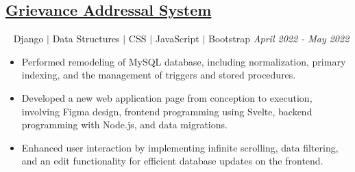 \documentclass[12pt]{article}
\begin{document}
\subsection*{\href{https://github.com/Akanksha2403/no_issues}{Grievance Addressal System}}~ Django $\vert$ Data Structures $\vert$ CSS $\vert$ JavaScript $\vert$ Bootstrap \hfill \textit{April 2022 - May 2022} \\
\begin{itemize}[leftmargin=*,topsep=0pt,itemsep=1pt,partopsep=1pt, parsep=1pt]
\item Performed remodeling of MySQL database, including normalization, primary indexing, and the management of triggers and stored procedures.
\item Developed a new web application page from conception to execution, involving Figma design, frontend programming using Svelte, backend programming with Node.js, and data migrations.
\item Enhanced user interaction by implementing infinite scrolling, data filtering, and an edit functionality for efficient database updates on the frontend.

\end{itemize}
\end{document}
